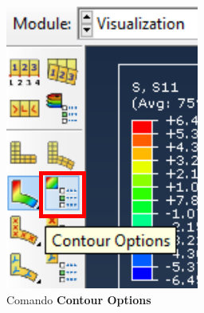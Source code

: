 \begin{enumerate}
  \begin{figure}[H]
    \centering
    \begin{subfigure}{0.19\textwidth}
      \includegraphics[width=\textwidth]{./body/images/imagen79.pdf}
      \caption{Comando \textbf{Contour Options}}
      \label{figu79}
    \end{subfigure}%
    ~ %
    \begin{subfigure}{0.35\textwidth}

\end{subfigure}
\end{figure}
\end{enumerate}
